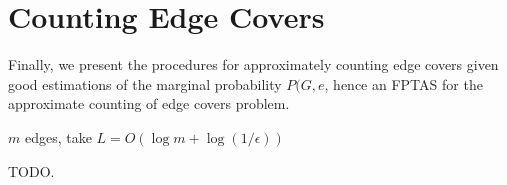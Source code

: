 \section{Counting Edge Covers}

Finally, we present the procedures for approximately counting edge covers given good estimations of the marginal probability $P(G,e$, hence an FPTAS for the approximate counting of edge covers problem.

$m$ edges, 
take $L=O(\log m + \log(1/ \epsilon))$

TODO.


